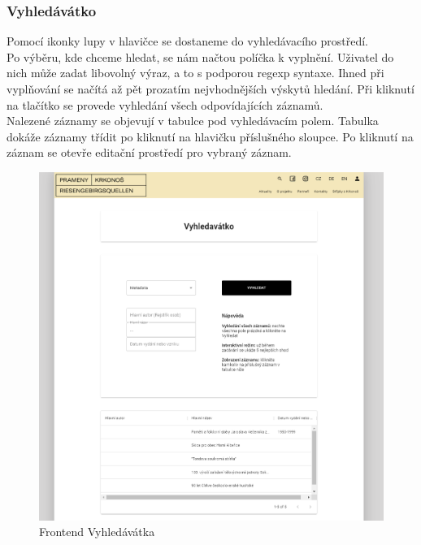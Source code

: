 \subsubsection{Vyhledávátko}
Pomocí ikonky lupy v hlavičce se dostaneme do vyhledávacího prostředí.\\
Po výběru, kde chceme hledat, se nám načtou políčka k vyplnění. Uživatel do nich může zadat
libovolný výraz, a to s podporou regexp syntaxe. Ihned při vyplňování se načítá až pět
prozatím nejvhodnějších výskytů hledání. Při kliknutí na tlačítko  se provede
vyhledání všech odpovídajících záznamů.\\
Nalezené záznamy se objevují v tabulce pod vyhledávacím polem.
Tabulka dokáže záznamy třídit po kliknutí na hlavičku příslušného sloupce.
Po kliknutí na záznam se otevře editační prostředí pro vybraný záznam.
\begin{figure}[H]
	\centering
	\includegraphics[width=.8\linewidth]{img/searchScene.png}
	\caption{Frontend Vyhledávátka}
\end{figure}

\pagebreak
